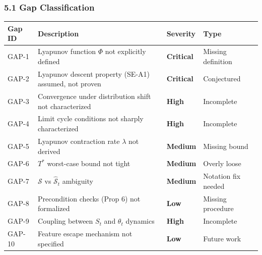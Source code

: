 \documentclass[
  12pt,
]{ctexart}
\begin{document}
\subsubsection{5.1 Gap Classification}\label{gap-classification}

\begin{longtable}[]{@{}
  >{\raggedright\arraybackslash}p{}
  >{\raggedright\arraybackslash}p{}
  >{\raggedright\arraybackslash}p{}
  >{\raggedright\arraybackslash}p{}@{}}
\toprule\noalign{}
\begin{minipage}[b]{\linewidth}\raggedright
Gap ID
\end{minipage} & \begin{minipage}[b]{\linewidth}\raggedright
Description
\end{minipage} & \begin{minipage}[b]{\linewidth}\raggedright
Severity
\end{minipage} & \begin{minipage}[b]{\linewidth}\raggedright
Type
\end{minipage} \\
\midrule\noalign{}
\endhead
\bottomrule\noalign{}
\endlastfoot
GAP-1 & Lyapunov function \(\Phi\) not explicitly defined &
\textbf{Critical} & Missing definition \\
GAP-2 & Lyapunov descent property (SE-A1) assumed, not proven &
\textbf{Critical} & Conjectured \\
GAP-3 & Convergence under distribution shift not characterized &
\textbf{High} & Incomplete \\
GAP-4 & Limit cycle conditions not sharply characterized & \textbf{High}
& Incomplete \\
GAP-5 & Lyapunov contraction rate \(\lambda\) not derived &
\textbf{Medium} & Missing bound \\
GAP-6 & \(T^*\) worst-case bound not tight & \textbf{Medium} & Overly
loose \\
GAP-7 & \(\mathcal{S}\) vs \(\hat{\mathcal{S}}_t\) ambiguity &
\textbf{Medium} & Notation fix needed \\
GAP-8 & Precondition checks (Prop 6) not formalized & \textbf{Low} &
Missing procedure \\
GAP-9 & Coupling between \(S_t\) and \(\theta_t\) dynamics &
\textbf{High} & Incomplete \\
GAP-10 & Feature escape mechanism not specified & \textbf{Low} & Future
work \\
\end{longtable}
\end{document}
